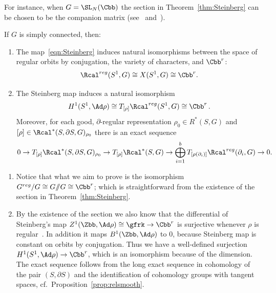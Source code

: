 For instance, when $G=\SL_N (\Cbb)$ the section in Theorem~\ref{thm:Steinberg} can be chosen to be the companion matrix (see~\cite[p.~120]{Steinberg} and~\cite[Section~4.15]{Humphreys}).


\begin{coro}\label{coro:Steinberg}
If $G$ is simply connected, then:
\begin{enumerate}\romanenumi
\item \label{coro-i}
The map~\eqref{eqn:Steinberg} induces natural isomorphisms between the space of regular orbits by conjugation, the variety of characters, and $\Cbb^r$:
\[
\Rcal^{reg}(S^1, G)\cong X(S^1, G)\cong \Cbb^r.
\]
\item \label{coro-ii}
The Steinberg map induces a natural isomorphism
\[
H^ 1(S^1,\Ad\rho)\cong T_{[\rho]}\Rcal^{reg}(S^1, G)\cong \Cbb^r\,.
\]
Moreover, for each good, $\partial$-regular representation $\rho_0\in R^*(S,G)$ and $ [\rho]\in\Rcal^*(S,\partial S,G)_{\rho_0}$ there is an exact sequence
\[
0\to T_{[\rho]}\Rcal^*(S,\partial S,G)_{\rho_0} \to T_{[\rho]}\Rcal^*(S,G) \to \bigoplus_{i=1}^b T_{[\rho(\partial_i)]} \Rcal^{reg}(\partial_i, G)
\to 0.
\]
\end{enumerate}
\end{coro}

\begin{proofc}
\begin{enumerate}\romanenumi
\item[{\eqref{coro-i}}] Notice that what we aim to prove is the isomorphism $ G^{reg}/G\cong G /\!\!/ G\cong \Cbb^r$; which is straightforward from the existence of the section in Theorem~\ref{thm:Steinberg}.
\item[{\eqref{coro-ii}}] By the existence of the section we also know that the differential of Steinberg's map $Z^1(\Zbb,\Ad\rho)\cong \gfrk\to \Cbb^r$ is surjective whenever $\rho$ is regular~\cite[Section~4.19]{Humphreys}. In addition it maps $B^1(\Zbb,\Ad\rho)$ to $0$, because Steinberg map is constant on orbits by conjugation. Thus we have a well-defined surjection $H^1(S^1,\Ad\rho)\to \Cbb^r$, which is an isomorphism because of the dimension. The exact sequence follows from the long exact sequence in cohomology of the pair $(S,\partial S)$ and the identification of cohomology groups with tangent spaces, cf.~Proposition~\ref{prop:relsmooth}.\qedhere
\end{enumerate}
\end{proofc}

